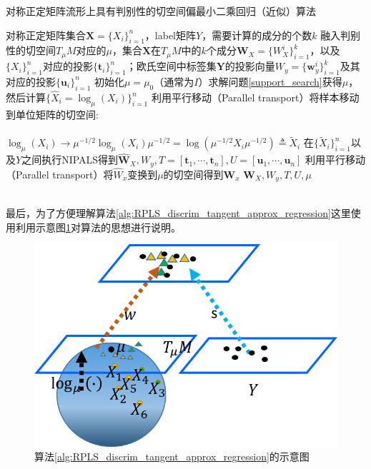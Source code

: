 \begin{algorithm}
\caption{对称正定矩阵流形上具有判别性的切空间偏最小二乘回归（近似）算法}
\label{alg:RPLS_discrim_tangent_approx_regression}
\begin{algorithmic}[1]
\REQUIRE 对称正定矩阵集合$\bm{X}=\{X_i\}_{i=1}^{n}$，label矩阵${Y}$，需要计算的成分的个数$k$
\ENSURE 融入判别性的切空间$T_{\mu}M$对应的$\mu$，集合$\bm{X}$在$T_{\mu}M$中的$k$个成分$\bm{W}_X=\{W_{X}^{i}\}_{i=1}^{k}$，以及$\{X_i\}_{i=1}^{n}$对应的投影$\{\bm{t}_i\}_{i=1}^{n}$；欧氏空间中标签集$\bm{Y}$的投影向量$W_y=\{\bm{w}_{y}^{i}\}_{i=1}^{k}$及其对应的投影$\{\bm{u}_i\}_{i=1}^{n}$
\STATE 初始化$\mu=\mu_0$（通常为$I$）求解问题\ref{support_search}获得$\mu$，然后计算$\{\hat{X}_i=\log_{\mu}(X_i)\}_{i=1}^{n}$
\STATE 利用平行移动（Parallel transport\cite{RCCA}）将样本移动到单位矩阵的切空间:\\
 ~~~~~~~~~~~~~~~~~~~~$\log_{\mu}(X_i)\rightarrow \mu^{-1/2}\log_{\mu}(X_i)\mu^{-1/2}=\log(\mu^{-1/2}X_i\mu^{-1/2})\triangleq \tilde{X}_i$
\STATE 在$\{\tilde{X}_{i}\}_{i=1}^{n}$以及${Y}$之间执行NIPALS\cite{pls_NIPALS}得到$\hat{\bm{W}}_X,W_y,T=[\bm{t}_1,\cdots,\bm{t}_n],U=[\bm{u}_1,\cdots,\bm{u}_n]$
\STATE 利用平行移动（Parallel transport\cite{RCCA}）将$\hat{W}_x$变换到$\mu$的切空间得到$\bm{W}_x$
\RETURN $\bm{W}_X,W_y,T,U,\mu$
\end{algorithmic}
\end{algorithm}\\
最后，为了方便理解算法\ref{alg:RPLS_discrim_tangent_approx_regression}这里使用利用示意图\ref{fig:discrim_tangent_RPLS}对算法的思想进行说明。
\begin{figure}
	\centering
	\includegraphics[width=0.5\linewidth]{source/Discrim_Tangent_PLS.png}
	\caption{算法\ref{alg:RPLS_discrim_tangent_approx_regression}的示意图}
	\label{fig:discrim_tangent_RPLS}
\end{figure}
